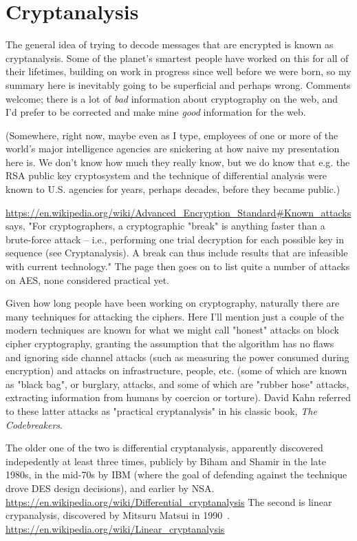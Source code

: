 \section{Cryptanalysis}


The general idea of trying to decode messages that are encrypted is
known as cryptanalysis.  Some of the planet's smartest people have
worked on this for all of their lifetimes, building on work in
progress since well before we were born, so my summary here is
inevitably going to be superficial and perhaps wrong.  Comments
welcome; there is a lot of \emph{bad} information about cryptography on the
web, and I'd prefer to be corrected and make mine \emph{good} information
for the web.

(Somewhere, right now, maybe even as I type, employees of one or more
of the world's major intelligence agencies are snickering at how naive
my presentation here is.  We don't know how much they really know, but
we do know that e.g. the RSA public key cryptosystem and the technique
of differential analysis were known to U.S. agencies for years,
perhaps decades, before they became public.)

\url{https://en.wikipedia.org/wiki/Advanced_Encryption_Standard#Known_attacks}
says, "For cryptographers, a cryptographic "break" is anything faster
than a brute-force attack – i.e., performing one trial decryption for
each possible key in sequence (see Cryptanalysis). A break can thus
include results that are infeasible with current technology."
The page then goes on to list quite a number of attacks on AES, none
considered practical yet.

Given how long people have been working on cryptography, naturally
there are many techniques for attacking the ciphers.  Here I'll
mention just a couple of the modern techniques are known for what we
might call "honest" attacks on block cipher cryptography, granting the
assumption that the algorithm has no flaws and ignoring side channel
attacks (such as measuring the power consumed during encryption) and
attacks on infrastructure, people, etc. (some of which are known as
"black bag", or burglary, attacks, and some of which are "rubber hose"
attacks, extracting information from humans by coercion or torture).
David Kahn referred to these latter attacks as "practical
cryptanalysis" in his classic book, \emph{The Codebreakers}.

The older one of the two is differential cryptanalysis, apparently
discovered indepedently at least three times, publicly by Biham and
Shamir in the late 1980s, in the mid-70s by IBM (where the goal of
defending against the technique drove DES design decisions), and
earlier by NSA.
\url{https://en.wikipedia.org/wiki/Differential_cryptanalysis}
The second is linear crypanalysis, discovered by Mitsuru Matsui in
1990~\cite{matsui1993linear}.
\url{https://en.wikipedia.org/wiki/Linear_cryptanalysis}

